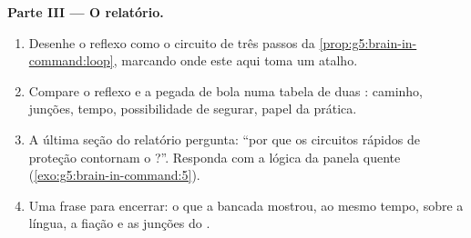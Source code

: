 \begin{problem}
\medskip\noindent\textbf{Parte III --- O relatório.}
\begin{enumerate}[resume]
  \item Desenhe o reflexo como o circuito de três passos da
        \cref{prop:g5:brain-in-command:loop}, marcando onde este aqui
        toma um atalho.
  \item Compare o reflexo e a pegada de bola numa tabela de duas
        : caminho, junções, tempo, possibilidade de segurar,
        papel da prática.
  \item A última seção do relatório pergunta: ``por que os circuitos
        rápidos de proteção contornam o ?''. Responda com a
        lógica da panela quente
        (\cref{exo:g5:brain-in-command:5}).
  \item Uma frase para encerrar: o que a bancada mostrou, ao mesmo
        tempo, sobre a língua, a fiação e as junções do .
\end{enumerate}
\end{problem}
